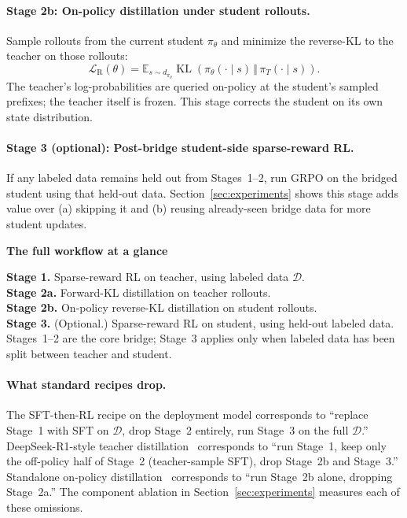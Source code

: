 \documentclass{article}
\begin{document}
\paragraph{Stage 2b: On-policy distillation under student rollouts.} Sample rollouts from the current student $\pi_\theta$ and minimize the reverse-KL to the teacher on those rollouts:
\[\mathcal{L}_{\mathrm{R}}(\theta) = \mathbb{E}_{s\sim d_{\pi_\theta}}\operatorname{KL}\!\left(\pi_\theta(\cdot\mid s)\,\Vert\,\pi_T(\cdot\mid s)\right).\]
The teacher's log-probabilities are queried on-policy at the student's sampled prefixes; the teacher itself is frozen. This stage corrects the student on its own state distribution.

\paragraph{Stage 3 (optional): Post-bridge student-side sparse-reward RL.} If any labeled data remains held out from Stages~1--2, run GRPO on the bridged student using that held-out data. Section~\ref{sec:experiments} shows this stage adds value over (a) skipping it and (b) reusing already-seen bridge data for more student updates.

\begin{claimcallout}
{\small\bfseries\textcolor{claimrule}{The full workflow at a glance}}\par\vspace{2pt}
{\small\color{claimtext}
\textbf{Stage 1.} Sparse-reward RL on teacher, using labeled data $\mathcal{D}$. \\
\textbf{Stage 2a.} Forward-KL distillation on teacher rollouts.\\
\textbf{Stage 2b.} On-policy reverse-KL distillation on student rollouts.\\
\textbf{Stage 3.} (Optional.) Sparse-reward RL on student, using held-out labeled data.\\[2pt]
Stages~1--2 are the core bridge; Stage~3 applies only when labeled data has been split between teacher and student.}
\end{claimcallout}

\paragraph{What standard recipes drop.} The SFT-then-RL recipe on the deployment model corresponds to ``replace Stage~1 with SFT on $\mathcal{D}$, drop Stage~2 entirely, run Stage~3 on the full $\mathcal{D}$.'' DeepSeek-R1-style teacher distillation~\citep{deepseek2025r1} corresponds to ``run Stage~1, keep only the off-policy half of Stage~2 (teacher-sample SFT), drop Stage~2b and Stage~3.'' Standalone on-policy distillation~\citep{agarwal2024onpolicy,lu2025onpolicydistillation} corresponds to ``run Stage~2b alone, dropping Stage~2a.'' The component ablation in Section~\ref{sec:experiments} measures each of these omissions.
\end{document}
